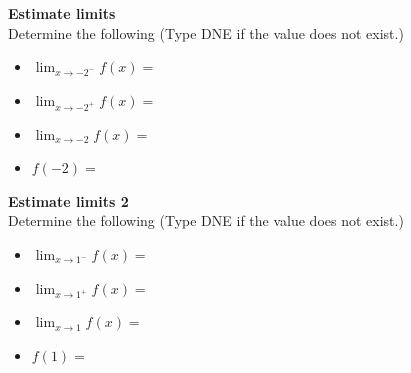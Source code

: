 \documentclass[pdftex, brazil, 12pt, twoside]{article}
\begin{document}
\begin{exercise}
  \textbf{Estimate limits}\\
  Determine the following (Type DNE if the value does not exist.)
  \begin{figure}[H]
    \begin{center}
    \end{center}
  \end{figure}
  \begin{itemize}
  \item $\displaystyle \lim_{x \to -2^{-}} f(x)=$
  \item $\displaystyle \lim_{x \to -2^{+}} f(x)=$
  \item $\displaystyle \lim_{x \to -2} f(x)=$
  \item $f(-2)=$
  \end{itemize}
\end{exercise}

\begin{exercise}
  \textbf{Estimate limits 2}\\
  Determine the following (Type DNE if the value does
  not exist.)
  \begin{figure}[H]
    \begin{center}
    \end{center}
  \end{figure}
  \begin{itemize}
  \item $\displaystyle \lim_{x \to 1^{-}} f(x)=$
  \item $\displaystyle \lim_{x \to 1^{+}} f(x)=$
  \item $\displaystyle \lim_{x \to 1} f(x)=$
  \item $f(1)=$
  \end{itemize}
\end{exercise}
\end{document}
